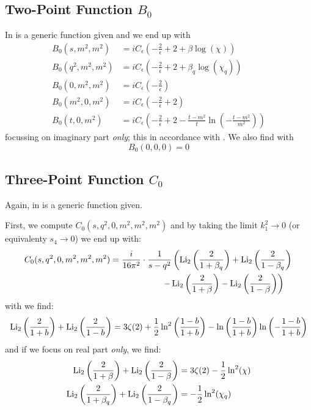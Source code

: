 \subsection[Two-Point Function B0]{Two-Point Function $B_0$}
In \cite[eq. (4.23)]{Denner:1991kt} is a generic function given and we end up with
\begin{align}
B_0(s,m^2,m^2) &= iC_\epsilon \left(-\frac 2 \epsilon+2+\beta\log(\chi)\right)\\
B_0(q^2,m^2,m^2) &= iC_\epsilon \left(-\frac 2 \epsilon+2+\beta_q\log(\chi_q)\right)\\
B_0(0,m^2,m^2) &= iC_\epsilon \left(-\frac 2 \epsilon\right)\\
B_0(m^2,0,m^2) &= iC_\epsilon \left(-\frac 2 \epsilon+2\right)\\
B_0(t,0,m^2) &= iC_\epsilon \left(-\frac 2 \epsilon+2-\frac{t-m^2}{t}\ln\left(-\frac{t-m^2}{m^2}\right)\right)
\end{align}
focussing on imaginary part \textit{only}; this in accordance with \cite{Bojak:2000eu}\cite{PhysRevD.40.54}. We also find with \cite{Bojak:2000eu}
\begin{equation}
B_0(0,0,0)=0
\end{equation}

\subsection[Three-Point Function C0]{Three-Point Function $C_0$}
Again, in \cite[eq. (4.26)]{Denner:1991qq} is a generic function given.

First, we compute $C_0(s,q^2,0,m^2,m^2,m^2)$ and by taking the limit $k_1^2\rightarrow 0$ (or equivalenty $s_4\rightarrow 0$) we end up with:
\begin{align}
C_0(s,q^2,0,m^2,m^2,m^2)&=\frac{i}{16\pi^2}\cdot\frac 1{s-q^2}\left(\operatorname{\text{Li}_2}\left(\frac 2 {1+\beta_q}\right)+\operatorname{\text{Li}_2}\left(\frac 2 {1-\beta_q}\right)\right.\nonumber\\
&\hspace{60pt}\left.-\operatorname{\text{Li}_2}\left(\frac 2 {1+\beta}\right)-\operatorname{\text{Li}_2}\left(\frac 2 {1-\beta}\right)\right)
\end{align}
with \cite{Zagier2007} we find:
\begin{equation}
\operatorname{\text{Li}_2}\left(\frac 2 {1+b}\right)+\operatorname{\text{Li}_2}\left(\frac 2 {1-b}\right) =3\zeta(2)+\frac 1 2\ln^2\left(\frac{1-b}{1+b}\right)-\ln\left(\frac{1-b}{1+b}\right)\ln\left(-\frac{1-b}{1+b}\right)
\end{equation}
and if we focus on real part \textit{only}, we find:
\begin{align}
\operatorname{\text{Li}_2}\left(\frac 2 {1+\beta}\right)+\operatorname{\text{Li}_2}\left(\frac 2 {1-\beta}\right) &=3\zeta(2)-\frac 1 2\ln^2(\chi)\\
\operatorname{\text{Li}_2}\left(\frac 2 {1+\beta_q}\right)+\operatorname{\text{Li}_2}\left(\frac 2 {1-\beta_q}\right) &=-\frac 1 2\ln^2(\chi_q)
\end{align}

